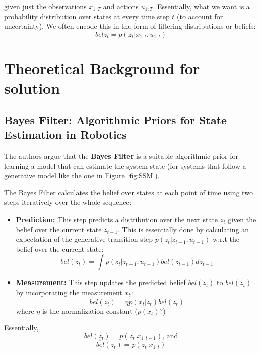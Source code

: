 \documentclass[10pt,twocolumn,letterpaper]{article}
\begin{document}
	given just the observations $x_{1:T}$ and actions $u_{1:T}$. Essentially, what we want is a probability distribution over states at every time step $t$ (to account for uncertainty). We often encode this in the form of filtering distributions or beliefs:
	\begin{equation}
	bel{z_t} = p(z_t|x_{1:t}, u_{1:t})
	\end{equation}
	
	\section{Theoretical Background for solution}
	
	\subsection{Bayes Filter: Algorithmic Priors for State Estimation in Robotics}
	
	The authors argue that the \textbf{Bayes Filter} is a suitable algorithmic prior for learning a model that can estimate the system state (for systems that follow a generative model like the one in Figure \ref{fig:SSM}).
	
	The Bayes Filter calculates the belief over states at each point of time using two steps iteratively over the whole sequence:
	
	\begin{itemize}
		\item \textbf{Prediction:} This step predicts a distribution over the next state $z_{t}$ given the belief over the current state $z_{t-1}$. This is essentially done by calculating an expectation of the generative transition step $p(z_t|z_{t-1}, u_{t-1})$ w.r.t the belief over the current state:
		\begin{equation}
		bel(z_t) = \int{p(z_t|z_{t-1}, u_{t-1})}\overline{bel}(z_{t-1}) dz_{t-1}
		\end{equation}
		\item \textbf{Measurement:} This step updates the predicted belief $bel(z_t)$ to $\overline{bel}(z_{t})$ by incorporating the measurement $x_t$:
		\begin{equation}
		\overline{bel}(z_t) = \eta p(x_t|z_t)bel(z_t)
		\end{equation}
		where $\eta$ is the normalization constant ($p(x_t)$?)
	\end{itemize}
	
	Essentially,
	\begin{equation}
	bel(z_t) = p(z_t|x_{1:t-1}) \text{, and} 
	\end{equation}
	\begin{equation}
	\overline{bel}(z_t) = p(z_t|x_{1:t})
	\end{equation}
	
\end{document}
